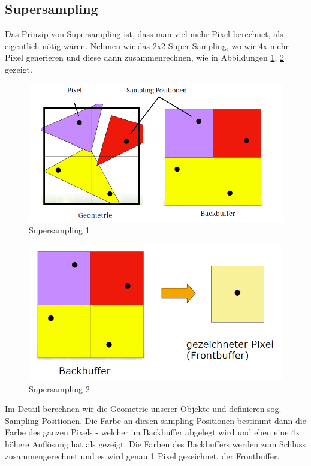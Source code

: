 \subsection{Supersampling}
Das Prinzip von Supersampling ist, dass man viel mehr Pixel berechnet, als eigentlich nötig wären. Nehmen wir das 2x2 Super Sampling, wo wir 4x mehr Pixel generieren und diese dann zusammenrechnen, wie in Abbildungen \ref{supersampling_1}, \ref{supersampling_2} gezeigt.
\begin{figure}[!ht]
	\centering
	\includegraphics[width=0.5\linewidth]{fig/supersampling_1}
	\caption{Supersampling 1}
	\label{supersampling_1}
\end{figure}
\begin{figure}[!ht]
	\centering
	\includegraphics[width=0.5\linewidth]{fig/supersampling_2}
	\caption{Supersampling 2}
	\label{supersampling_2}
\end{figure}
Im Detail berechnen wir die Geometrie unserer Objekte und definieren sog. Sampling Positionen. Die Farbe an diesen sampling Positionen bestimmt dann die Farbe des ganzen Pixels - welcher im Backbuffer abgelegt wird und eben eine 4x höhere Auflösung hat als gezeigt. Die Farben des Backbuffers werden zum Schluss zusammengerechnet und es wird genau 1 Pixel gezeichnet, der Frontbuffer.